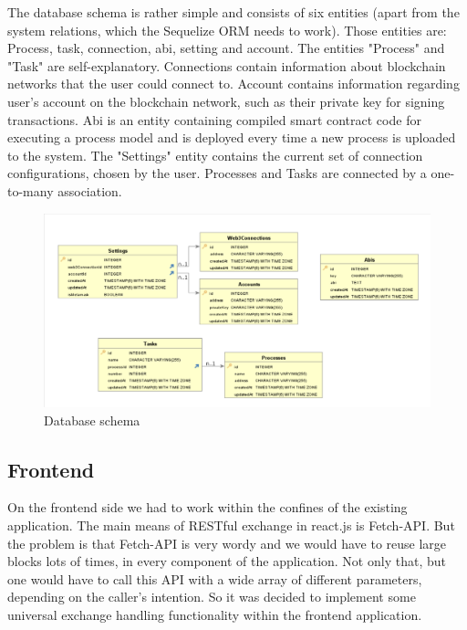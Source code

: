 The database schema is rather simple and consists of six entities (apart from the system relations, which the Sequelize ORM needs to work). Those entities are: Process, task, connection, abi, setting and account. The entities "Process" and "Task" are self-explanatory. Connections contain information about blockchain networks that the user could connect to. Account contains information regarding user's account on the blockchain network, such as their private key for signing transactions. Abi is an entity containing compiled smart contract code for executing a process model and is deployed every time a new process is uploaded to the system. The "Settings" entity contains the current set of connection configurations, chosen by the user. Processes and Tasks are connected by a one-to-many association.

\begin{figure}[hbt]
	\includegraphics[width=\textwidth]{gfx/persistence_schema}
	\caption{Database schema}
	\label{fig:impr:persistence:schema}
\end{figure}

\subsection{Frontend}
\label{sec:impr:persistence:frontend}

On the frontend side we had to work within the confines of the existing application. The main means of RESTful exchange in react.js is Fetch-API. But the problem is that Fetch-API is very wordy and we would have to reuse large blocks lots of times, in every component of the application. Not only that, but one would have to call this API with a wide array of different parameters, depending on the caller's intention. So it was decided to implement some universal exchange handling functionality within the frontend application.

